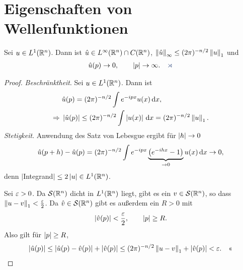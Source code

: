 \chapter{Eigenschaften von Wellenfunktionen}

\begin{lem}
\label{prop:1.1}
Sei $u\in L^1(\mathbb{R}^n)$. Dann ist $\hat{u}\in L^\infty(\mathbb{R}^n)\cap C(\mathbb{R}^n)$,
$\left\|\hat{u}\right\|_\infty \le (2\pi)^{-n/2}\left\|u\right\|_1$ und
\begin{align*}
\hat{u}(p) \to 0,\qquad \abs{p}\to\infty.\fishhere
\end{align*}
\end{lem}
\begin{proof}
\textit{Beschränktheit}. 
Sei $u\in L^1(\mathbb{R}^n)$. Dann ist
\begin{align*}
&\hat{u}(p) = (2\pi)^{-n/2}\int e^{-ipx}u(x)\,\mathrm{d} x,\\
\Rightarrow\; &
\left|\hat{u}(p)\right| \le (2\pi)^{-n/2}
\int\left|u(x)\right|\,\mathrm{d} x = (2\pi)^{-n/2}\left\|u\right\|_1.
\end{align*}
\textit{Stetigkeit}. Anwendung des Satz von Lebesgue ergibt für $\left|h\right|\to 0$
\begin{align*}
\hat{u}(p+h)-\hat{u}(p) = (2\pi)^{-n/2}
\int e^{-ipx}\underbrace{\left(e^{-ihx} - 1\right)}_{\to 0}u(x)\,\mathrm{d} x \to 0,
\end{align*}
denn $|$Integrand$| \le 2\left|u\right|\in L^1(\mathbb{R}^n)$.

Sei $\varepsilon > 0$. Da $\mathcal{S}(\mathbb{R}^n)$ dicht in $L^1(\mathbb{R}^n)$ liegt, gibt es ein $v\in
\mathcal{S}(\mathbb{R}^n)$, so dass $\left\|u-v\right\|_1 < \frac{\varepsilon}{2}$. Da
$\hat{v}\in\mathcal{S}(\mathbb{R}^n)$ gibt es außerdem ein $R>0$ mit
\begin{align*}
\left|\hat{v}(p)\right| < \frac{\varepsilon}{2},\qquad \left|p\right| \ge R.
\end{align*}
Also gilt für $\left|p\right|\ge R$,
\begin{align*}
\left|\hat{u}(p)\right| \le \left|\hat{u}(p)-\hat{v}(p)\right| + \left|\hat{v}(p)\right|
\le (2\pi)^{-n/2}\left\|u-v\right\|_1 + \left|\hat{v}(p)\right| < \varepsilon.\quad\text{<<}
\end{align*}
\end{proof}

